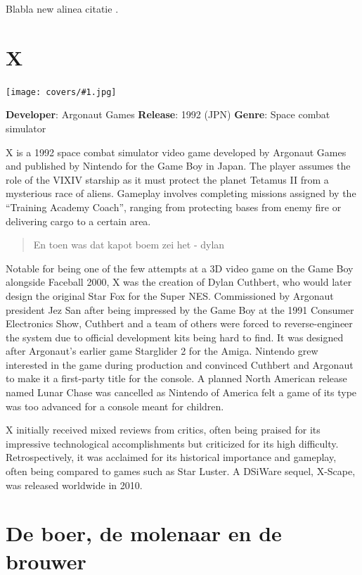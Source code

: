 \documentclass[
  english,
  symmetric,justified,marginals=raggedouter]{tufte-book}
\newcommand\cover[4]{
  \begin{marginfigure}[5cm] %
    \texttt{[image: covers/\#1.jpg]}
    \caption{\textbf{Developer}: #2 \newline \textbf{Release}: #3 \newline \textbf{Genre}: #4}
    \label{fig:marginfig}
  \end{marginfigure}  
}
\begin{document}
Blabla new alinea citatie \citep{dreyfus1980five}.

\mainmatter

\hypertarget{x}{%
\chapter{X}\label{x}}

\cover{x}{Argonaut Games}{1992 (JPN)}{Space combat simulator}

X is a 1992 space combat simulator video game developed by Argonaut
Games and published by Nintendo for the Game Boy in Japan. The player
assumes the role of the VIXIV starship as it must protect the planet
Tetamus II from a mysterious race of aliens. Gameplay involves
completing missions assigned by the ``Training Academy Coach'', ranging
from protecting bases from enemy fire or delivering cargo to a certain
area.

\begin{quote}
En toen was dat kapot boem zei het - dylan
\end{quote}

Notable for being one of the few attempts at a 3D video game on the Game
Boy alongside Faceball 2000, X was the creation of Dylan Cuthbert, who
would later design the original Star Fox for the Super NES. Commissioned
by Argonaut president Jez San after being impressed by the Game Boy at
the 1991 Consumer Electronics Show, Cuthbert and a team of others were
forced to reverse-engineer the system due to official development kits
being hard to find. It was designed after Argonaut's earlier game
Starglider 2 for the Amiga. Nintendo grew interested in the game during
production and convinced Cuthbert and Argonaut to make it a first-party
title for the console. A planned North American release named Lunar
Chase was cancelled as Nintendo of America felt a game of its type was
too advanced for a console meant for children.

X initially received mixed reviews from critics, often being praised for
its impressive technological accomplishments but criticized for its high
difficulty. Retrospectively, it was acclaimed for its historical
importance and gameplay, often being compared to games such as Star
Luster. A DSiWare sequel, X-Scape, was released worldwide in 2010.

\hypertarget{de-boer-de-molenaar-en-de-brouwer}{%
\chapter{De boer, de molenaar en de
brouwer}\label{de-boer-de-molenaar-en-de-brouwer}}
\end{document}
